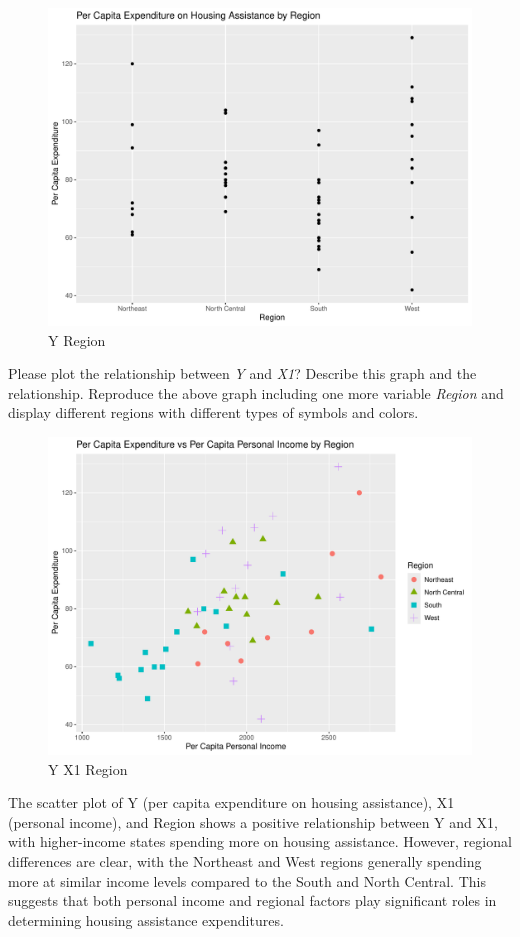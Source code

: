 \documentclass[12pt,letterpaper]{article}
\begin{document}
\begin{itemize}
 \begin{figure}[h!]\centering
	\caption{\footnotesize Y Region}
	\label{fig:2}
	\includegraphics[width=.75\textwidth]{plot_Y_Region.pdf}
\end{figure}

Please plot the relationship between \emph{Y} and \emph{X1}? Describe this graph and the relationship. Reproduce the above graph including one more variable \emph{Region} and display different regions with different types of symbols and colors.
\vspace{.2cm}
 
\end{itemize}

 \begin{figure}[h!]\centering
	\caption{\footnotesize Y X1 Region}
	\label{fig:4}
	\includegraphics[width=.75\textwidth]{plot_Y_X1_Region.pdf}
\end{figure}
The scatter plot of Y (per capita expenditure on housing assistance), X1 (personal income), and Region shows a positive relationship between Y and X1, with higher-income states spending more on housing assistance. However, regional differences are clear, with the Northeast and West regions generally spending more at similar income levels compared to the South and North Central. This suggests that both personal income and regional factors play significant roles in determining housing assistance expenditures.\\
\end{document}
